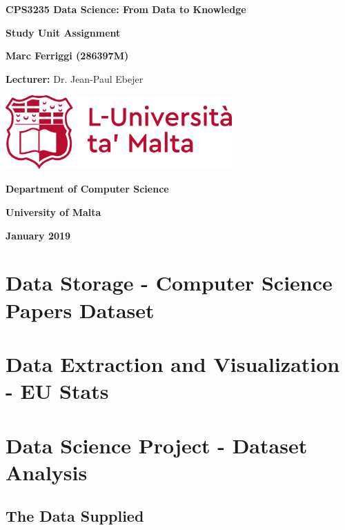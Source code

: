\documentclass[12pt]{report}
\begin{document}
	\begin{titlepage}
		\centering
		{\LARGE\bfseries CPS3235 Data Science: From Data to Knowledge\par}
		\vspace{.5cm}
		
		{\Large \textbf{Study Unit Assignment} \par}
		\vspace{.5cm}
		
		{\large \textbf{Marc Ferriggi (286397M)}\par}
		\vspace{0.5cm}
		
		{\large \textbf{Lecturer:} Dr. Jean-Paul Ebejer\par}
		\vfill
		
		\includegraphics[width=0.65\textwidth]{UoMLogo}\par
		\vfill
		
		{\large\bfseries Department of Computer Science \par}
		{\large\bfseries University of Malta \par}
		{\large\bfseries January 2019 \par}
	\end{titlepage}
	
	\tableofcontents
	\vfill
	\cleardoublepage
	
	\section{Data Storage - Computer Science Papers Dataset}
	\pagebreak
	
	\section{Data Extraction and Visualization - EU Stats}
	\pagebreak
	
	\section{Data Science Project - Dataset Analysis}
	\subsection{The Data Supplied}
\end{document}
